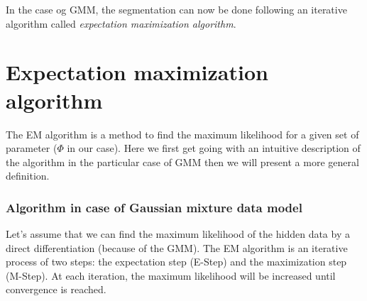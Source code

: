 In the case og GMM, the segmentation can now be done following an iterative algorithm called \textit{expectation maximization algorithm}.
%
\section{Expectation maximization algorithm}
The EM algorithm is a method to find the maximum likelihood for a given set of parameter ($\Phi$ in our case). Here we first get going with an 
intuitive description of the algorithm in the particular case of GMM then we will present a more general definition.
%
\subsubsection{Algorithm in case of Gaussian mixture data model}
Let's assume that we can find the maximum likelihood of the hidden data by a direct differentiation (because of the GMM). The EM algorithm is an iterative process of two steps: the expectation step (E-Step) and the maximization step (M-Step). At each iteration, the maximum likelihood will be increased until convergence is reached.\\
